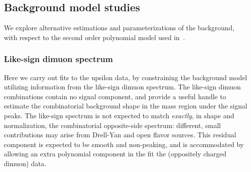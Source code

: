 
\subsection{Background model studies}
\label{sec:bgmodel}


We explore alternative estimations and parameterizations of the background, with respect to the second order polynomial model used in~\cite{CMS_AN_2010-140, CMS_AN_2011_062}.  

\subsubsection{Like-sign dimuon spectrum}
\label{sec:like-sign}

Here we carry out fits to the upsilon data, by constraining the background model utilizing information from the like-sign dimuon spectrum. 
The like-sign dimuon combinations contain no signal component, and provide a useful handle to estimate the combinatorial background shape in the mass region under the signal peaks. 
The like-sign spectrum is not expected to match \emph{exactly}, in shape and normalization, the combinatorial opposite-side spectrum: 
different, small contributions may arise from Drell-Yan and open flavor sources. This residual component is expected to be smooth and non-peaking, and is accommodated by allowing an extra polynomial component in the fit the (oppositely charged dimuon) data. 

